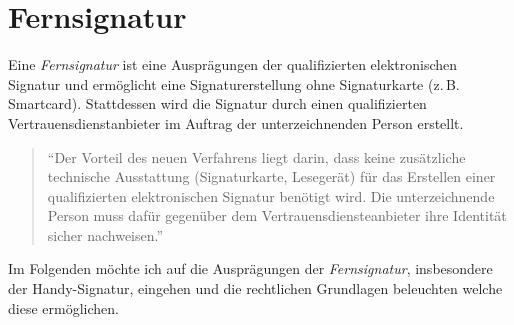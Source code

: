 \documentclass[11pt,a4paper,ngerman]{scrreprt}
\begin{document}
\chapter{Fernsignatur}
Eine \textit{Fernsignatur} ist eine Ausprägungen der qualifizierten elektronischen Signatur und ermöglicht eine Signaturerstellung ohne Signaturkarte (z.\,B. Smartcard). Stattdessen wird die Signatur durch einen qualifizierten Vertrauensdienstanbieter im Auftrag der unterzeichnenden Person erstellt.
\begin{quote}
    ``Der Vorteil des neuen Verfahrens liegt darin, dass keine zusätzliche technische Ausstattung (Signaturkarte, Lesegerät) für das Erstellen einer qualifizierten elektronischen Signatur benötigt wird. Die unterzeichnende Person muss dafür gegenüber dem Vertrauensdiensteanbieter ihre Identität sicher nachweisen.''\cite{fernsig}
\end{quote}
Im Folgenden möchte ich auf die Ausprägungen der \textit{Fernsignatur}, insbesondere der Handy-Signatur, eingehen und die rechtlichen Grundlagen beleuchten welche diese ermöglichen.
\end{document}
